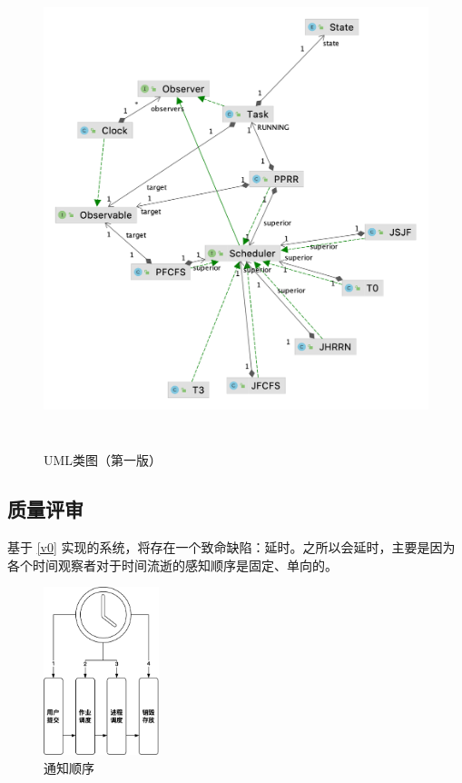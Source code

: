\documentclass[12pt, a4paper, UTF8]{ctexart}
\begin{document}
\begin{figure}[htbp]
    \centering
    \includegraphics[height=395pt]{v0-class-compat.png}
    \caption{UML类图（第一版）}
\end{figure}

\newpage

\newpage

\subsection{质量评审}

基于 \ref{v0} 实现的系统，将存在一个致命缺陷：延时。之所以会延时，主要是因为各个时间观察者对于时间流逝的感知顺序是固定、单向的。
\begin{figure}[htbp]
    \centering
    \includegraphics[height=13.2em]{i-lag.png}
    \caption{通知顺序}
\end{figure}
\end{document}
